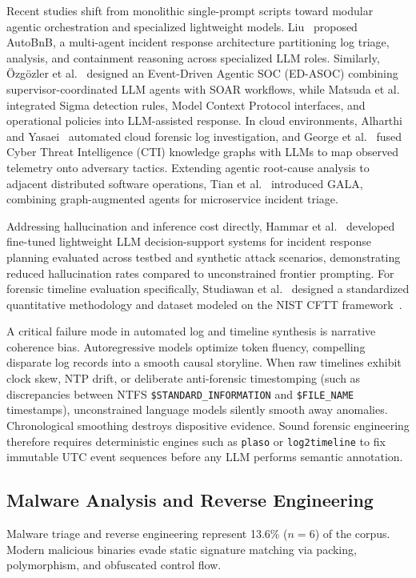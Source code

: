 Recent studies shift from monolithic single-prompt scripts toward modular agentic orchestration and specialized lightweight models. Liu~\cite{liu2025_autobnb} proposed AutoBnB, a multi-agent incident response architecture partitioning log triage, analysis, and containment reasoning across specialized LLM roles. Similarly, {\"O}zg{\"o}zler et al.~\cite{zgzler2026_eventdriven} designed an Event-Driven Agentic SOC (ED-ASOC) combining supervisor-coordinated LLM agents with SOAR workflows, while Matsuda et al.~\cite{matsuda2025_enhancing} integrated Sigma detection rules, Model Context Protocol interfaces, and operational policies into LLM-assisted response. In cloud environments, Alharthi and Yasaei~\cite{alharthi2025_llmpowered} automated cloud forensic log investigation, and George et al.~\cite{george2025_llm} fused Cyber Threat Intelligence (CTI) knowledge graphs with LLMs to map observed telemetry onto adversary tactics. Extending agentic root-cause analysis to adjacent distributed software operations, Tian et al.~\cite{tian2026_gala} introduced GALA, combining graph-augmented agents for microservice incident triage.

Addressing hallucination and inference cost directly, Hammar et al.~\cite{hammar2026_incident, hammar2026_a} developed fine-tuned lightweight LLM decision-support systems for incident response planning evaluated across testbed and synthetic attack scenarios, demonstrating reduced hallucination rates compared to unconstrained frontier prompting. For forensic timeline evaluation specifically, Studiawan et al.~\cite{studiawan2025_towards} designed a standardized quantitative methodology and dataset modeled on the NIST CFTT framework~\cite{nist_cftt}.

A critical failure mode in automated log and timeline synthesis is narrative coherence bias. Autoregressive models optimize token fluency, compelling disparate log records into a smooth causal storyline. When raw timelines exhibit clock skew, NTP drift, or deliberate anti-forensic timestomping (such as discrepancies between NTFS \texttt{\$STANDARD\_INFORMATION} and \texttt{\$FILE\_NAME} timestamps), unconstrained language models silently smooth away anomalies. Chronological smoothing destroys dispositive evidence. Sound forensic engineering therefore requires deterministic engines such as \texttt{plaso} or \texttt{log2timeline} to fix immutable UTC event sequences before any LLM performs semantic annotation.

\subsection{Malware Analysis and Reverse Engineering}
Malware triage and reverse engineering represent 13.6\% ($n=6$) of the corpus. Modern malicious binaries evade static signature matching via packing, polymorphism, and obfuscated control flow.

